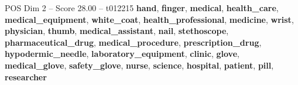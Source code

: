 \begin{textsample}{POS Dim 2 – Score 28.00 – t012215}  \label{ex:f2_pos_029}
\textbf{hand}, \textbf{finger}, \textbf{medical}, \textbf{health\_care}, \textbf{medical\_equipment}, \textbf{white\_coat}, \textbf{health\_professional}, \textbf{medicine}, \textbf{wrist}, \textbf{physician}, \textbf{thumb}, \textbf{medical\_assistant}, \textbf{nail}, \textbf{stethoscope}, \textbf{pharmaceutical\_drug}, \textbf{medical\_procedure}, \textbf{prescription\_drug}, \textbf{hypodermic\_needle}, \textbf{laboratory\_equipment}, \textbf{clinic}, \textbf{glove}, \textbf{medical\_glove}, \textbf{safety\_glove}, \textbf{nurse}, \textbf{science}, \textbf{hospital}, \textbf{patient}, \textbf{pill}, \textbf{researcher}

\end{textsample}
